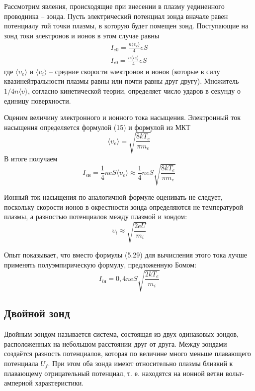 Рассмотрим явления, происходящие при
внесении в плазму уединенного проводника
-- зонда. Пусть электрический потенциал
зонда вначале равен потенциалу той точки
плазмы, в которую будет помещен зонд.
Поступающие на зонд токи электронов и
ионов в этом случае равны
\begin{align}
    I_{e0} = \frac{n \langle \upsilon_e
    \rangle}{4}e S \\
    I_{i0} = \frac{n \langle \upsilon_i
    \rangle}{4}e S
\end{align}
где $\langle \upsilon_e \rangle$ и
$\langle \upsilon_i \rangle$ -- средние
скорости электронов и ионов (которые в
силу квазинейтральности плазмы равны или
почти равны друг другу). Множитель $1/4
n \langle \upsilon \rangle$, согласно
кинетической теории, определяет число
ударов в секунду о единицу поверхности.

Оценим величину электронного и ионного
тока насыщения. Электронный ток
насыщения определяется формулой (15) и
формулой из МКТ
\begin{equation}
    \langle \upsilon_e \rangle =
    \sqrt{\frac{8kT_e}{\pi m_e}}
\end{equation}
В итоге получаем
\begin{equation}
    I_{e\text{н}} = \frac{1}{4} n e S
    \langle \upsilon_e \rangle \approx
    \frac{1}{4} n e S \sqrt{\frac{8 k
    T_e}{\pi m_e}}
\end{equation}

Ионный ток насыщения по аналогичной
формуле оценивать не следует, поскольку
скорости ионов в окрестности зонда
определяются не температурой плазмы, а
разностью потенциалов между плазмой и
зондом:
\begin{equation}
    \upsilon_i \approx \sqrt{\frac{2 e
    U}{m_i}}
\end{equation}

Опыт показывает, что вместо формулы
(5.29) для вычисления этого тока лучше
применять полуэмпирическую формулу,
предложенную Бомом:
\begin{equation}
    I_{i\text{н}} = 0,4 n e S
    \sqrt{\frac{2 k T_e}{m_i}}
\end{equation}

\subsection*{Двойной зонд}
Двойным зондом называется система,
состоящая из двух одинаковых зондов,
расположенных на небольшом расстоянии
друг от друга. Между зондами создаётся
разность потенциалов, которая по
величине много меньше плавающего
потенциала $U_f$. При этом оба зонда имеют
относительно плазмы близкий к плавающему
отрицательный потенциал, т. е. находятся
на ионной ветви вольт-амперной
характеристики.

